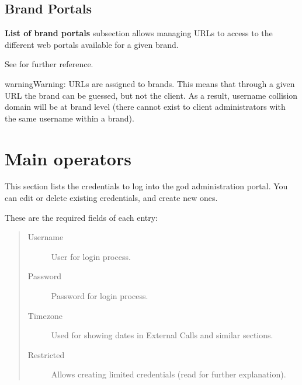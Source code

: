 \documentclass[letterpaper,10pt,english]{sphinxmanual}
\begin{document}
\subsection{Brand Portals}
\label{administration_portal/platform/brands:brand-portals}\label{administration_portal/platform/brands:id3}
\textbf{List of brand portals} subsection allows managing URLs to access to the different web portals available for a given brand.

See {\hyperref[administration_portal/brand/settings/client_portals:id1]{}} for further reference.

\begin{notice}{warning}{Warning:}
URLs are assigned to brands. This means that through a given URL the brand can be guessed, but not the client.
As a result, username collision domain will be at brand level (there cannot exist to client administrators
with the same username within a brand).
\end{notice}


\section{Main operators}
\label{administration_portal/platform/main_operators::doc}\label{administration_portal/platform/main_operators:main-operators}\label{administration_portal/platform/main_operators:id1}
This section lists the credentials to log into the god administration portal. You can edit or delete existing credentials,
and create new ones.

These are the required fields of each entry:
\begin{quote}
\begin{description}
\item[{Username}] \leavevmode
User for login process.

\item[{Password}] \leavevmode
Password for login process.

\item[{Timezone}] \leavevmode
Used for showing dates in External Calls and similar sections.

\item[{Restricted}] \leavevmode
Allows creating limited credentials (read {\hyperref[api_rest/acls:acls]{}} for further explanation).

\end{description}
\end{quote}
\end{document}
